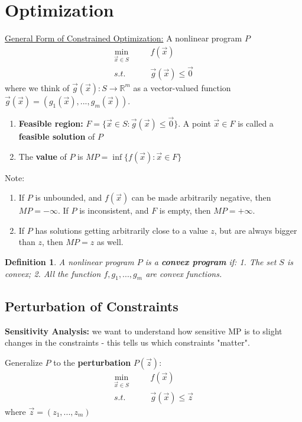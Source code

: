 \documentclass[11pt,a4paper]{article}
\newtheorem{definition}{Definition}
\begin{document}
\section{Optimization}
\underline{General Form of Constrained Optimization:} A nonlinear program $P$
\begin{equation}
    \begin{aligned}
        \min_{\vec{x}\in S}&\quad &f(\vec{x})\\
        s.t.& &\vec{g}(\vec{x})\leq \vec{0}
    \end{aligned}
    \nonumber
\end{equation}
where we think of $\vec{g}(\vec{x}): S \rightarrow \mathbb{R}^m$ as a vector-valued function $\vec{g}(\vec{x})=\left(g_1(\vec{x}),...,g_m(\vec{x})\right)$.
\begin{enumerate}
    \item \textbf{Feasible region:} $F=\{\vec{x}\in S: \vec{g}(\vec{x})\leq \vec{0}\}$. A point $\vec{x}\in F$ is called a \textbf{feasible solution} of $P$
    \item The \textbf{value} of $P$ is $MP=\inf\{f(\vec{x}): \vec{x}\in F\}$
\end{enumerate}
Note:
\begin{enumerate}[$\bullet$]
    \item If $P$ is unbounded, and $f(\vec{x})$ can be made arbitrarily negative, then $MP = -\infty$. If $P$ is inconsistent, and $F$ is empty, then $MP = +\infty$.
    \item If $P$ has solutions getting arbitrarily close to a value $z$, but are always bigger than $z$, then $MP =z$ as well.
\end{enumerate}

\begin{definition}
    A nonlinear program $P$ is a \textbf{convex program} if: 1. The set $S$ is convex; 2. All the function $f,g_1,...,g_m$ are convex functions.
\end{definition}

\subsection{Perturbation of Constraints}
\textbf{Sensitivity Analysis:} we want to understand how sensitive MP is to slight changes in the constraints - this tells us which constraints "matter".

Generalize $P$ to the \textbf{perturbation} $P(\vec{z})$:
\begin{equation}
    \begin{aligned}
        \min_{\vec{x}\in S}&\quad &f(\vec{x})\\
        s.t.& &\vec{g}(\vec{x})\leq \vec{z}
    \end{aligned}
    \nonumber
\end{equation}
where $\vec{z}=(z_1,...,z_m)$
\end{document}
